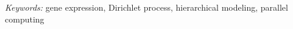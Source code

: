 \documentclass[12pt]{article}
\begin{document}
\noindent%
{\it Keywords:}  gene expression, Dirichlet process, hierarchical modeling, parallel computing
\vfill

\newpage
\tableofcontents




\appendix


% 
% 
% 
% 





\end{document}
